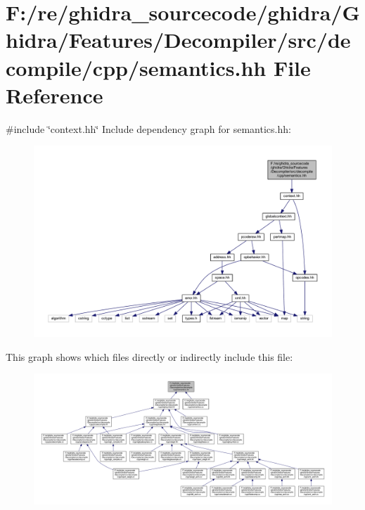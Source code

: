 \hypertarget{semantics_8hh}{}\section{F\+:/re/ghidra\+\_\+sourcecode/ghidra/\+Ghidra/\+Features/\+Decompiler/src/decompile/cpp/semantics.hh File Reference}
\label{semantics_8hh}
{\ttfamily \#include \char`\"{}context.\+hh\char`\"{}}\newline
Include dependency graph for semantics.\+hh\+:
\nopagebreak
\begin{figure}[H]
\begin{center}
\leavevmode
\includegraphics[width=350pt]{semantics_8hh__incl}
\end{center}
\end{figure}
This graph shows which files directly or indirectly include this file\+:
\nopagebreak
\begin{figure}[H]
\begin{center}
\leavevmode
\includegraphics[width=350pt]{semantics_8hh__dep__incl}
\end{center}
\end{figure}
